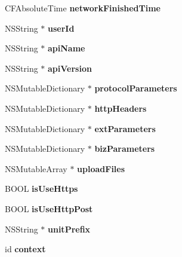 \begin{DoxyCompactItemize}
C\+F\+Absolute\+Time {\bfseries network\+Finished\+Time}
\item 
\mbox{\label{interface_t_b_s_d_k_request_af1ff67dba8e96f103258af828dced66b}} 
N\+S\+String $\ast$ {\bfseries user\+Id}
\item 
\mbox{\label{interface_t_b_s_d_k_request_a9dc1901b5d191d405845d0422b4b66d9}} 
N\+S\+String $\ast$ {\bfseries api\+Name}
\item 
\mbox{\label{interface_t_b_s_d_k_request_af310993486d5c3404d30186366d3c323}} 
N\+S\+String $\ast$ {\bfseries api\+Version}
\item 
\mbox{\label{interface_t_b_s_d_k_request_ac2ee916cab448124a5417f306425b4b3}} 
N\+S\+Mutable\+Dictionary $\ast$ {\bfseries protocol\+Parameters}
\item 
\mbox{\label{interface_t_b_s_d_k_request_a1511f8c4686bd0cec6c2c674ae5a514c}} 
N\+S\+Mutable\+Dictionary $\ast$ {\bfseries http\+Headers}
\item 
\mbox{\label{interface_t_b_s_d_k_request_a8849e60a405546b49bfc7f7192dec29e}} 
N\+S\+Mutable\+Dictionary $\ast$ {\bfseries ext\+Parameters}
\item 
\mbox{\label{interface_t_b_s_d_k_request_afca943ffa6b92dfda492e9bc27397901}} 
N\+S\+Mutable\+Dictionary $\ast$ {\bfseries biz\+Parameters}
\item 
\mbox{\label{interface_t_b_s_d_k_request_a325c44b15c504aa058626f3030b62885}} 
N\+S\+Mutable\+Array $\ast$ {\bfseries upload\+Files}
\item 
\mbox{\label{interface_t_b_s_d_k_request_a9d8cc94a8f2d73000af4084b2f305be5}} 
B\+O\+OL {\bfseries is\+Use\+Https}
\item 
\mbox{\label{interface_t_b_s_d_k_request_a5caf26b7986e8ad3120ab9bc49cb2e4c}} 
B\+O\+OL {\bfseries is\+Use\+Http\+Post}
\item 
\mbox{\label{interface_t_b_s_d_k_request_aeabd8adefff7bfd4db311e856ad88367}} 
N\+S\+String $\ast$ {\bfseries unit\+Prefix}
\item 
\mbox{\label{interface_t_b_s_d_k_request_acc19cb21876f7ab086dc8995ba78639f}} 
id {\bfseries context}
\end{DoxyCompactItemize}


